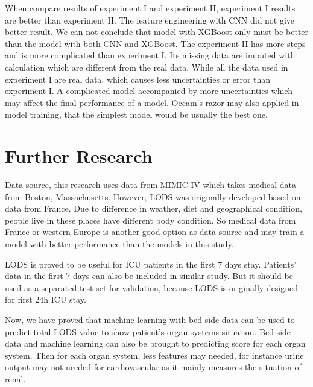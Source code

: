 \documentclass[12pt,a4paper,english
]{tunithesis}
\begin{document}
When compare results of experiment I and experiment II, experiment I results are better than experiment II. The feature engineering with CNN did not give better result. We can not conclude that model with XGBoost only must be better than the model with both CNN and XGBoost. The experiment II has more steps and is more complicated than experiment I. Its missing data are imputed with calculation which are different from the real data. While all the data used in experiment I are real data, which causes less uncertainties or error than experiment I. A complicated model accompanied by more uncertainties which may affect the final performance of a model. Occam's razor may also applied in model training, that the simplest model would be usually the best one.


\section{Further Research}
Data source, this research uses data from MIMIC-IV which takes medical data from Boston, Massachusetts. However, LODS was originally developed based on data from France. Due to difference in weather, diet and geographical condition, people live in these places have different body condition. So medical data from France or western Europe is another good option as data source and may train a model with better performance than the models in this study.

LODS is proved to be useful for ICU patients in the first 7 days stay. Patients' data in the first 7 days can also be included in similar study. But it should be used as a separated test set for validation, because LODS is originally designed for first 24h ICU stay.

Now, we have proved that machine learning with bed-side data can be used to predict total LODS value to show patient's organ systems situation. Bed side data and machine learning can also be brought to predicting score for each organ system. Then for each organ system, less features may needed, for instance urine output may not needed for cardiovascular as it mainly measures the situation of renal.




\newpage

\printbibliography[title=References]


%
\end{document}
